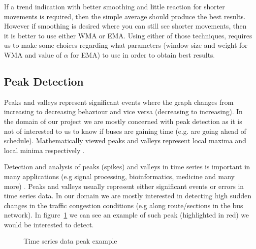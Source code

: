 If a trend indication with better smoothing and little reaction for shorter movements is required, then the simple average should produce the best results. However if smoothing is desired where you can still see shorter movements, then it is better to use either WMA or EMA. Using either of those techniques, requires us to make some choices regarding what parameters (window size and weight for WMA and value of $\alpha$ for EMA) to use in order to obtain best results.


\subsection{Peak Detection}
Peaks and valleys represent significant events where the graph changes from increasing to decreasing behaviour and vice versa (decreasing to increasing). In the domain of our project we are mostly concerned with peak detection as it is not of interested to us to know if buses are gaining time (e.g. are going ahead of schedule). Mathematically viewed peaks and valleys represent local maxima and local minima respectively \cite{simon1994mathematics}.

Detection and analysis of peaks (spikes) and valleys in time series is important in many applications (e.g signal processing, bioinformatics, medicine and many more) \cite{ventzas2011peak}. Peaks and valleys usually represent either significant events or errors in time series data. In our domain we are mostly interested in detecting high sudden changes in the traffic congestion conditions (e.g along route/sections in the bus network). In figure~\ref{fig:peakExampleGraph} we can see an example of such peak (highlighted in red) we would be interested to detect.

\begin{figure}[ht]
	\caption{Time series data peak example}
	\label{fig:peakExampleGraph}
\end{figure}

